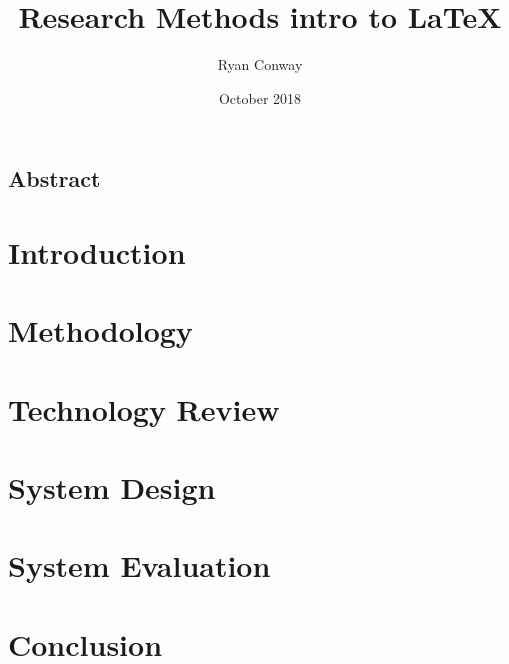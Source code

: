 \documentclass{report}
\title{Research Methods intro to LaTeX}
\author{Ryan Conway}
\date{October 2018}
\begin{document}
\maketitle

\section{Abstract}

\chapter{Introduction}


\chapter{Methodology}


\chapter{Technology Review}


\chapter{System Design}


\chapter{System Evaluation}


\chapter{Conclusion}

\end{document}
